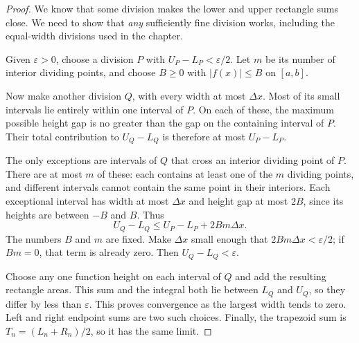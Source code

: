 \begin{proof}
We know that some division makes the lower and upper rectangle sums
close. We need to show that \textit{any} sufficiently fine division
works, including the equal-width divisions used in the chapter.

Given $\varepsilon>0$, choose a division $P$ with
$U_P-L_P<\varepsilon/2$. Let $m$ be its number of interior dividing
points, and choose $B\geq0$ with $|f(x)|\leq B$ on $[a,b]$.

Now make another division $Q$, with every width at most $\Delta x$.
Most of its small intervals lie entirely within one interval of $P$.
On each of these, the maximum possible height gap is no greater than
the gap on the containing interval of $P$. Their total contribution
to $U_Q-L_Q$ is therefore at most $U_P-L_P$.

The only exceptions are intervals of $Q$ that cross an interior dividing
point of $P$. There are at most $m$ of these: each contains at least
one of the $m$ dividing points, and different intervals cannot contain
the same point in their interiors. Each exceptional interval has width
at most $\Delta x$ and height gap at most $2B$, since its heights are
between $-B$ and $B$. Thus
$$U_Q-L_Q\leq U_P-L_P+2Bm\Delta x.$$
The numbers $B$ and $m$ are fixed. Make $\Delta x$ small enough that
$2Bm\Delta x<\varepsilon/2$; if $Bm=0$, that term is already zero.
Then $U_Q-L_Q<\varepsilon$.

Choose any one function height on each interval of $Q$ and add the
resulting rectangle areas. This sum and the integral both lie between
$L_Q$ and $U_Q$, so they differ by less than $\varepsilon$. This proves
convergence as the largest width tends to zero. Left and right endpoint
sums are two such choices. Finally, the trapezoid sum is
$T_n=(L_n+R_n)/2$, so it has the same limit.
\end{proof}


